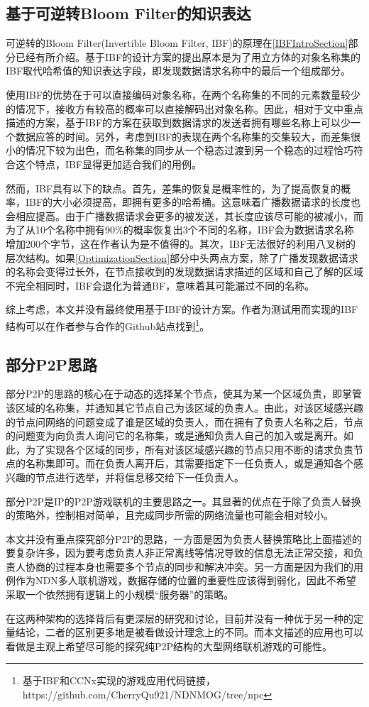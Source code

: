 \subsection{基于可逆转Bloom Filter的知识表达}
\label{IBFComparisonSection}
\par
可逆转的Bloom Filter(Invertible Bloom Filter, IBF)的原理在\ref{IBFIntroSection}部分已经有所介绍。基于IBF的设计方案的提出原本是为了用立方体的对象名称集的IBF取代哈希值的知识表达字段，即发现数据请求名称中的最后一个组成部分。
\par
使用IBF的优势在于可以直接编码对象名称，在两个名称集的不同的元素数量较少的情况下，接收方有较高的概率可以直接解码出对象名称。因此，相对于文中重点描述的方案，基于IBF的方案在获取到数据请求的发送者拥有哪些名称上可以少一个数据应答的时间。另外，考虑到IBF的表现在两个名称集的交集较大，而差集很小的情况下较为出色，而名称集的同步从一个稳态过渡到另一个稳态的过程恰巧符合这个特点，IBF显得更加适合我们的用例。
\par
然而，IBF具有以下的缺点。首先，差集的恢复是概率性的，为了提高恢复的概率，IBF的大小必须提高，即拥有更多的哈希桶。这意味着广播数据请求的长度也会相应提高。由于广播数据请求会更多的被发送，其长度应该尽可能的被减小，而为了从10个名称中拥有90\%的概率恢复出3个不同的名称，IBF会为数据请求名称增加200个字节，这在作者认为是不值得的。其次，IBF无法很好的利用八叉树的层次结构。如果\ref{OptimizationSection}部分中头两点方案，除了广播发现数据请求的名称会变得过长外，在节点接收到的发现数据请求描述的区域和自己了解的区域不完全相同时，IBF会退化为普通BF，意味着其可能漏过不同的名称。
\par
综上考虑，本文并没有最终使用基于IBF的设计方案。作者为测试用而实现的IBF结构可以在作者参与合作的Github站点找到\footnote{基于IBF和CCNx实现的游戏应用代码链接，https://github.com/CherryQu921/NDNMOG/tree/npc}。
\subsection{部分P2P思路}
\label{PartialP2PSection}
\par
部分P2P的思路的核心在于动态的选择某个节点，使其为某一个区域负责，即掌管该区域的名称集，并通知其它节点自己为该区域的负责人。由此，对该区域感兴趣的节点问网络的问题变成了谁是区域的负责人，而在拥有了负责人名称之后，节点的问题变为向负责人询问它的名称集，或是通知负责人自己的加入或是离开。如此，为了实现各个区域的同步，所有对该区域感兴趣的节点只用不断的请求负责节点的名称集即可。而在负责人离开后，其需要指定下一任负责人，或是通知各个感兴趣的节点进行选举，并将信息移交给下一任负责人。
\par
部分P2P是IP的P2P游戏联机的主要思路之一。其显著的优点在于除了负责人替换的策略外，控制相对简单，且完成同步所需的网络流量也可能会相对较小。
\par
本文并没有重点探究部分P2P的思路，一方面是因为负责人替换策略比上面描述的要复杂许多，因为要考虑负责人非正常离线等情况导致的信息无法正常交接，和负责人协商的过程本身也需要多个节点的同步和解决冲突。另一方面是因为我们的用例作为NDN多人联机游戏，数据存储的位置的重要性应该得到弱化，因此不希望采取一个依然拥有逻辑上的小规模“服务器”的策略。
\par
在这两种架构的选择背后有更深层的研究和讨论，目前并没有一种优于另一种的定量结论，二者的区别更多地是被看做设计理念上的不同。而本文描述的应用也可以看做是主观上希望尽可能的探究纯P2P结构的大型网络联机游戏的可能性。
